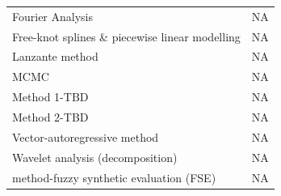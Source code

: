 \documentclass[12pt,twoside,openany]{reedthesis}
\begin{document}
\begin{longtable}[]{@{}lc@{}}
\begin{minipage}[t]{0.31\columnwidth}
Fourier Analysis\strut
\end{minipage} & \begin{minipage}[t]{0.34\columnwidth}\centering\strut
NA\strut
\end{minipage}\tabularnewline
\begin{minipage}[t]{0.31\columnwidth}\raggedright\strut
Free-knot splines \& piecewise linear modelling\strut
\end{minipage} & \begin{minipage}[t]{0.34\columnwidth}\centering\strut
NA\strut
\end{minipage}\tabularnewline
\begin{minipage}[t]{0.31\columnwidth}\raggedright\strut
Lanzante method\strut
\end{minipage} & \begin{minipage}[t]{0.34\columnwidth}\centering\strut
NA\strut
\end{minipage}\tabularnewline
\begin{minipage}[t]{0.31\columnwidth}\raggedright\strut
MCMC\strut
\end{minipage} & \begin{minipage}[t]{0.34\columnwidth}\centering\strut
NA\strut
\end{minipage}\tabularnewline
\begin{minipage}[t]{0.31\columnwidth}\raggedright\strut
Method 1-TBD\strut
\end{minipage} & \begin{minipage}[t]{0.34\columnwidth}\centering\strut
NA\strut
\end{minipage}\tabularnewline
\begin{minipage}[t]{0.31\columnwidth}\raggedright\strut
Method 2-TBD\strut
\end{minipage} & \begin{minipage}[t]{0.34\columnwidth}\centering\strut
NA\strut
\end{minipage}\tabularnewline
\begin{minipage}[t]{0.31\columnwidth}\raggedright\strut
Vector-autoregressive method\strut
\end{minipage} & \begin{minipage}[t]{0.34\columnwidth}\centering\strut
NA\strut
\end{minipage}\tabularnewline
\begin{minipage}[t]{0.31\columnwidth}\raggedright\strut
Wavelet analysis (decomposition)\strut
\end{minipage} & \begin{minipage}[t]{0.34\columnwidth}\centering\strut
NA\strut
\end{minipage}\tabularnewline
\begin{minipage}[t]{0.31\columnwidth}\raggedright\strut
method-fuzzy synthetic evaluation (FSE)\strut
\end{minipage} & \begin{minipage}[t]{0.34\columnwidth}\centering\strut
NA\strut
\end{minipage}\tabularnewline
\bottomrule
\end{longtable}
\end{document}
